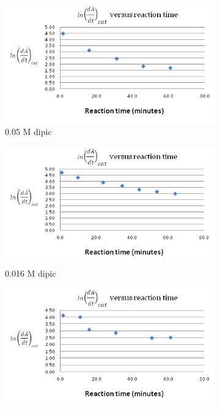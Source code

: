 \begin{figure}[h]
\begin{subfigure}{0.5\textwidth}
        \end{subfigure}
        \begin{subfigure}{0.5\textwidth}
                \includegraphics[width=\textwidth]{./Figures/05M_dipic_readings.png}
                \caption{0.05 M dipic}
                \label{fig:0.05M_dipic_readings}
        \end{subfigure}\begin{subfigure}{0.5\textwidth}
                \includegraphics[width=\textwidth]{./Figures/016M_dipic_readings.png}
                \caption{0.016 M dipic}
                \label{fig:0.016M_dipic_readings}
        \end{subfigure}
        \begin{subfigure}{0.5\textwidth}
                \includegraphics[width=\textwidth]{./Figures/032M_dipic_readings.png}

\end{subfigure}
\end{figure}
